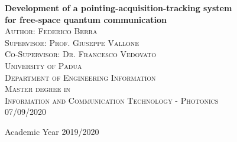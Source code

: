 \begin{titlepage}
  \begin{center}


    {\LARGE \bfseries Development of a pointing-acquisition-tracking system\\ for free-space quantum communication}\\[2cm]

    \textsc{\large Author: Federico Berra}\\
    \textsc{\large Supervisor: Prof. Giuseppe Vallone}\\
    \textsc{\large Co-Supervisor: Dr. Francesco Vedovato}\\[1.2cm]

    \textsc{\LARGE University of Padua}\\[1.2cm]

    \textsc{\Large Department of Engineering Information}\\[1.2cm]

    \textsc{\Large Master degree in}\\[0.5cm]
    \textsc{\Large Information and Communication Technology - Photonics}\\[2cm]
    \textsc{\large 07/09/2020}\\
    \vfill

    {\large Academic Year 2019/2020}
  \end{center}
\end{titlepage}
